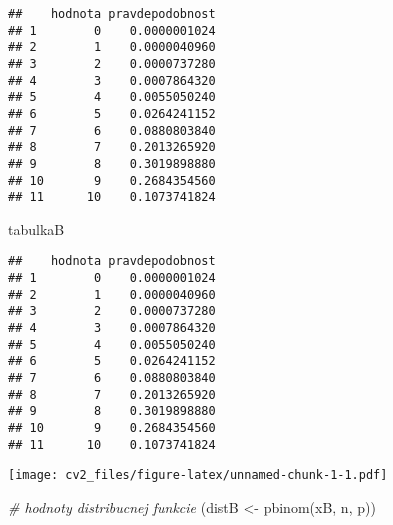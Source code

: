 \documentclass[
]{article}
\newenvironment{Shaded}{\begin{snugshade}}{\end{snugshade}}
\newcommand{\AttributeTok}[1]{\textcolor[rgb]{0.77,0.63,0.00}{#1}}
\newcommand{\CommentTok}[1]{\textcolor[rgb]{0.56,0.35,0.01}{\textit{#1}}}
\newcommand{\FunctionTok}[1]{\textcolor[rgb]{0.00,0.00,0.00}{#1}}
\newcommand{\NormalTok}[1]{#1}
\newcommand{\OtherTok}[1]{\textcolor[rgb]{0.56,0.35,0.01}{#1}}
\newcommand{\SpecialCharTok}[1]{\textcolor[rgb]{0.00,0.00,0.00}{#1}}
\newcommand{\StringTok}[1]{\textcolor[rgb]{0.31,0.60,0.02}{#1}}
\begin{document}
\begin{verbatim}
##    hodnota pravdepodobnost
## 1        0    0.0000001024
## 2        1    0.0000040960
## 3        2    0.0000737280
## 4        3    0.0007864320
## 5        4    0.0055050240
## 6        5    0.0264241152
## 7        6    0.0880803840
## 8        7    0.2013265920
## 9        8    0.3019898880
## 10       9    0.2684354560
## 11      10    0.1073741824
\end{verbatim}

\begin{Shaded}
\begin{Highlighting}[]
\NormalTok{tabulkaB}
\end{Highlighting}
\end{Shaded}

\begin{verbatim}
##    hodnota pravdepodobnost
## 1        0    0.0000001024
## 2        1    0.0000040960
## 3        2    0.0000737280
## 4        3    0.0007864320
## 5        4    0.0055050240
## 6        5    0.0264241152
## 7        6    0.0880803840
## 8        7    0.2013265920
## 9        8    0.3019898880
## 10       9    0.2684354560
## 11      10    0.1073741824
\end{verbatim}

\begin{Shaded}
\end{Shaded}

\texttt{[image: cv2\_files/figure-latex/unnamed-chunk-1-1.pdf]}

\begin{Shaded}
\begin{Highlighting}[]
\CommentTok{\# hodnoty distribucnej funkcie}
\NormalTok{(distB }\OtherTok{\textless{}{-}} \FunctionTok{pbinom}\NormalTok{(xB, n, p))}
\end{Highlighting}
\end{Shaded}
\end{document}
